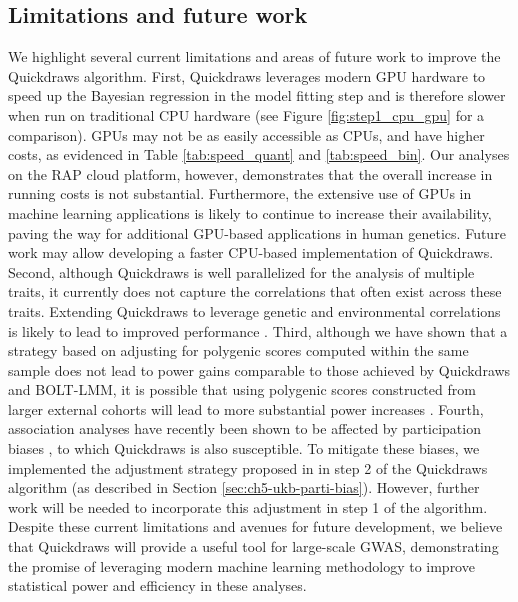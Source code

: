 
\subsection{Limitations and future work}

We highlight several current limitations and areas of future work to improve the Quickdraws algorithm.
%
First, Quickdraws leverages modern GPU hardware to speed up the Bayesian regression in the model fitting step and is therefore slower when run on traditional CPU hardware (see Figure \ref{fig:step1_cpu_gpu} for a comparison).
%
GPUs may not be as easily accessible as CPUs, and have higher costs, as evidenced in Table \ref{tab:speed_quant} and \ref{tab:speed_bin}.
%
Our analyses on the RAP cloud platform, however, demonstrates that the overall increase in running costs is not substantial.
%
Furthermore, the extensive use of GPUs in machine learning applications is likely to continue to increase their availability, paving the way for additional GPU-based applications in human genetics.
%
Future work may allow developing a faster CPU-based implementation of Quickdraws.
%
Second, although Quickdraws is well parallelized for the analysis of multiple traits, it currently does not capture the correlations that often exist across these traits.
%
Extending Quickdraws to leverage genetic and environmental correlations is likely to lead to improved performance \cite{korte2012mixed,zhou2014efficient}.
%
%
Third, although we have shown that a strategy based on adjusting for polygenic scores computed within the same sample does not lead to power gains comparable to those achieved by Quickdraws and BOLT-LMM, it is possible that using polygenic scores constructed from larger external cohorts will lead to more substantial power increases \cite{campos2023boosting, jurgens2023adjusting}.
%
Fourth, association analyses have recently been shown to be affected by participation biases \cite{pirastu2021genetic, benonisdottir2023studying}, to which Quickdraws is also susceptible.
%
To mitigate these biases, we implemented the adjustment strategy proposed in \cite{schoeler2023participation} in step 2 of the Quickdraws algorithm (as described in Section \ref{sec:ch5-ukb-parti-bias}).
%
However, further work will be needed to incorporate this adjustment in step 1 of the algorithm.
%
Despite these current limitations and avenues for future development, we believe that Quickdraws will provide a useful tool for large-scale GWAS, demonstrating the promise of leveraging modern machine learning methodology to improve statistical power and efficiency in these analyses.

